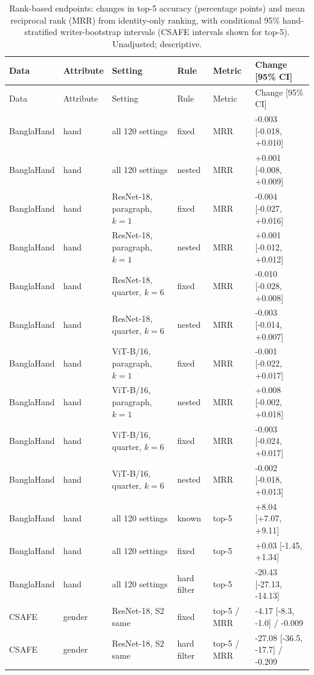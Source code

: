 {\footnotesize\setlength{\tabcolsep}{3pt}
\begin{longtable}{llllll}
\caption{Rank-based endpoints: changes in top-5 accuracy (percentage points) and mean reciprocal rank (MRR) from identity-only ranking, with conditional 95\% hand-stratified writer-bootstrap intervals (CSAFE intervals shown for top-5). Unadjusted; descriptive.}\label{tab:rank}\\
\toprule Data & Attribute & Setting & Rule & Metric & Change [95\% CI]\\\midrule
\endfirsthead
\toprule Data & Attribute & Setting & Rule & Metric & Change [95\% CI]\\\midrule
\endhead
BanglaHand & hand & all 120 settings & fixed & MRR & -0.003 [-0.018, +0.010] \\
BanglaHand & hand & all 120 settings & nested & MRR & +0.001 [-0.008, +0.009] \\
BanglaHand & hand & ResNet-18, paragraph, $k=1$ & fixed & MRR & -0.004 [-0.027, +0.016] \\
BanglaHand & hand & ResNet-18, paragraph, $k=1$ & nested & MRR & +0.001 [-0.012, +0.012] \\
BanglaHand & hand & ResNet-18, quarter, $k=6$ & fixed & MRR & -0.010 [-0.028, +0.008] \\
BanglaHand & hand & ResNet-18, quarter, $k=6$ & nested & MRR & -0.003 [-0.014, +0.007] \\
BanglaHand & hand & ViT-B/16, paragraph, $k=1$ & fixed & MRR & -0.001 [-0.022, +0.017] \\
BanglaHand & hand & ViT-B/16, paragraph, $k=1$ & nested & MRR & +0.008 [-0.002, +0.018] \\
BanglaHand & hand & ViT-B/16, quarter, $k=6$ & fixed & MRR & -0.003 [-0.024, +0.017] \\
BanglaHand & hand & ViT-B/16, quarter, $k=6$ & nested & MRR & -0.002 [-0.018, +0.013] \\
BanglaHand & hand & all 120 settings & known & top-5 & +8.04 [+7.07, +9.11] \\
BanglaHand & hand & all 120 settings & fixed & top-5 & +0.03 [-1.45, +1.34] \\
BanglaHand & hand & all 120 settings & hard filter & top-5 & -20.43 [-27.13, -14.13] \\
\midrule
CSAFE & gender & ResNet-18, S2 same & fixed & top-5 / MRR & -4.17 [-8.3, -1.0] / -0.009 \\
CSAFE & gender & ResNet-18, S2 same & hard filter & top-5 / MRR & -27.08 [-36.5, -17.7] / -0.209 \\

\end{longtable}}
